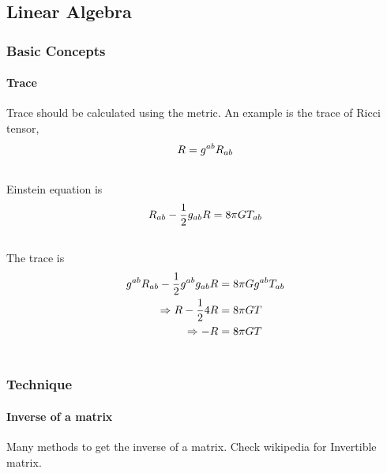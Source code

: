 \documentclass[letterpaper,10pt,english]{sphinxmanual}
\begin{document}
\subsection{Linear Algebra}
\label{math:id1}

\subsubsection{Basic Concepts}
\label{math:basic-concepts}

\paragraph{Trace}
\label{math:trace}
Trace should be calculated using the metric. An example is the trace of Ricci tensor,
\begin{gather}
\begin{split}R=g^{ab}R_{ab}\end{split}\notag\\\begin{split}\end{split}\notag
\end{gather}
Einstein equation is
\begin{gather}
\begin{split}R_{ab}-\frac{1}{2}g_{ab}R=8\pi G T_{ab}\end{split}\notag\\\begin{split}\end{split}\notag
\end{gather}
The trace is
\begin{gather}
\begin{split}g^{ab}R_{ab}-\frac{1}{2}g^{ab}g_{ab}R &= 8\pi G g^{ab}T_{ab} \\
\Rightarrow R-\frac{1}{2} 4 R  &=  8\pi G T \\
\Rightarrow -R &= 8\pi GT\end{split}\notag\\\begin{split}\end{split}\notag
\end{gather}

\subsubsection{Technique}
\label{math:technique}

\paragraph{Inverse of a matrix}
\label{math:inverse-of-a-matrix}
Many methods to get the inverse of a matrix. Check wikipedia for Invertible matrix.
\end{document}
